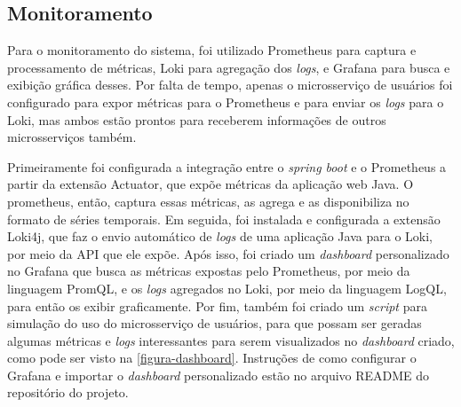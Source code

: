 

\subsection{Monitoramento}
Para o monitoramento do sistema, foi utilizado Prometheus para captura e processamento de métricas, Loki para agregação dos \emph{logs}, e Grafana para busca e exibição gráfica desses. Por falta de tempo, apenas o microsserviço de usuários foi configurado para expor métricas para o Prometheus e para enviar os \emph{logs} para o Loki, mas ambos estão prontos para receberem informações de outros microsserviços também. 

Primeiramente foi configurada a integração entre o \emph{spring boot} e o Prometheus a partir da extensão Actuator, que expõe métricas da aplicação web Java. O prometheus, então, captura essas métricas, as agrega e as disponibiliza no formato de séries temporais. Em seguida, foi instalada e configurada a extensão Loki4j, que faz o envio automático de \emph{logs} de uma aplicação Java para o Loki, por meio da API que ele expõe. Após isso, foi criado um \emph{dashboard} personalizado no Grafana que busca as métricas expostas pelo Prometheus, por meio da linguagem PromQL, e os \emph{logs} agregados no Loki, por meio da linguagem LogQL, para então os exibir graficamente. Por fim, também foi criado um \emph{script} para simulação do uso do microsserviço de usuários, para que possam ser geradas algumas métricas e \emph{logs} interessantes para serem visualizados no \emph{dashboard} criado, como pode ser visto na \autoref{figura-dashboard}. Instruções de como configurar o Grafana e importar o \emph{dashboard} personalizado estão no arquivo README do repositório do projeto.

